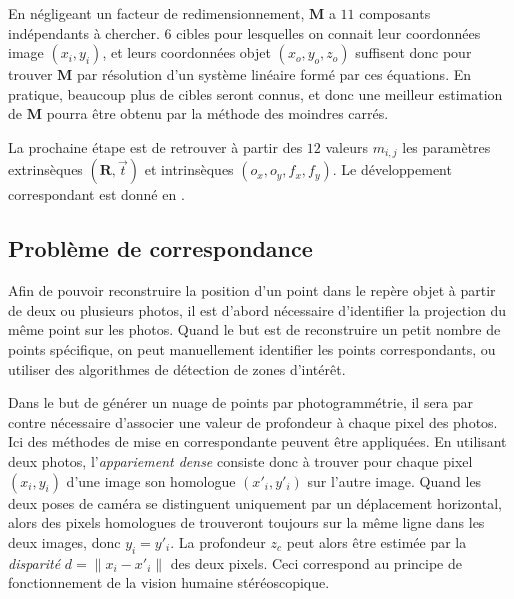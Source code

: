 \documentclass[a4paper,10pt]{scrreprt}
\begin{document}
En négligeant un facteur de redimensionnement, $\mathbf{M}$ a $11$ composants indépendants à chercher. $6$ cibles pour lesquelles on connait leur coordonnées image $(x_i, y_i)$, et leurs coordonnées objet $(x_o, y_o, z_o)$ suffisent donc pour trouver $\mathbf{M}$ par résolution d'un système linéaire formé par ces équations. En pratique, beaucoup plus de cibles seront connus, et donc une meilleur estimation de $\mathbf{M}$ pourra être obtenu par la méthode des moindres carrés.

La prochaine étape est de retrouver à partir des $12$ valeurs $m_{i,j}$ les paramètres extrinsèques $(\mathbf{R}, \vec{t})$ et intrinsèques $(o_x, o_y, f_x, f_y)$. Le développement correspondant est donné en \cite{Trus1998}.



\subsection{Problème de correspondance}
Afin de pouvoir reconstruire la position d'un point dans le repère objet à partir de deux ou plusieurs photos, il est d'abord nécessaire d'identifier la projection du même point sur les photos. Quand le but est de reconstruire un petit nombre de points spécifique, on peut manuellement identifier les points correspondants, ou utiliser des algorithmes de détection de zones d'intérêt.

Dans le but de générer un nuage de points par photogrammétrie, il sera par contre nécessaire d'associer une valeur de profondeur à chaque pixel des photos. Ici des méthodes de mise en correspondante peuvent être appliquées. En utilisant deux photos, l'\emph{appariement dense} consiste donc à trouver pour chaque pixel $(x_i, y_i)$ d'une image son homologue $(x'_i, y'_i)$ sur l'autre image. Quand les deux poses de caméra se distinguent uniquement par un déplacement horizontal, alors des pixels homologues de trouveront toujours sur la même ligne dans les deux images, donc $y_i = y'_i$. La profondeur $z_c$ peut alors être estimée par la \emph{disparité} $d = \| x_i - x'_i \|$ des deux pixels. \cite{Gard2009} Ceci correspond au principe de fonctionnement de la vision humaine stéréoscopique.
\end{document}
